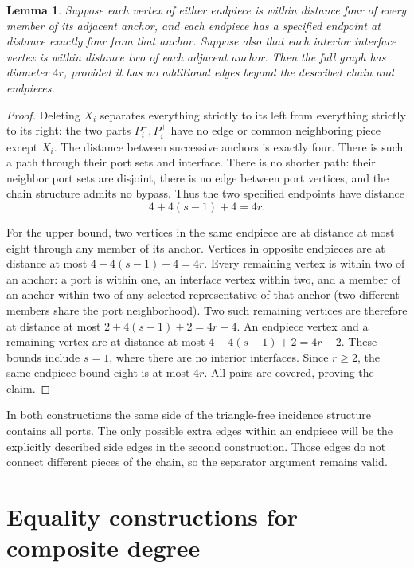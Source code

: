 \documentclass[11pt]{article}
\newtheorem{lemma}[theorem]{Lemma}
\begin{document}
\begin{lemma}\label{metric}
Suppose each vertex of either endpiece is within distance four of
every member of its adjacent anchor, and each endpiece has a specified
endpoint at distance exactly four from that anchor. Suppose also that
each interior interface vertex is within distance two of each adjacent
anchor. Then the full graph has diameter $4r$, provided it has no
additional edges beyond the described chain and endpieces.
\end{lemma}
\begin{proof}
Deleting $X_i$ separates everything strictly to its left from everything
strictly to its right: the two parts $P_i^-,P_i^+$ have no edge or
common neighboring piece except $X_i$. The distance between successive
anchors is exactly four. There is such a path through their port sets
and interface. There is no shorter path: their neighbor port sets
are disjoint, there is no edge between port vertices, and the chain
structure admits no bypass. Thus the two specified endpoints have
distance
\[
 4+4(s-1)+4=4r.
\]

For the upper bound, two vertices in the same endpiece are at distance
at most eight through any member of its anchor. Vertices in opposite
endpieces are at distance at most $4+4(s-1)+4=4r$.
Every remaining vertex is within two of an anchor: a port is within
one, an interface vertex within two, and a member of an anchor within
two of any selected representative of that anchor (two different
members share the port neighborhood). Two such remaining vertices are
therefore at distance at most $2+4(s-1)+2=4r-4$.
An endpiece vertex and a remaining vertex are at distance at most
$4+4(s-1)+2=4r-2$. These bounds include $s=1$, where there are no
interior interfaces. Since $r\geq2$, the same-endpiece bound eight
is at most $4r$. All pairs are covered, proving the claim.
\end{proof}

In both constructions the same side of the triangle-free incidence
structure contains all ports. The only possible extra edges within
an endpiece will be the explicitly described side edges in the
second construction. Those edges do not connect different pieces
of the chain, so the separator argument remains valid.

\section{Equality constructions for composite degree}
\end{document}
